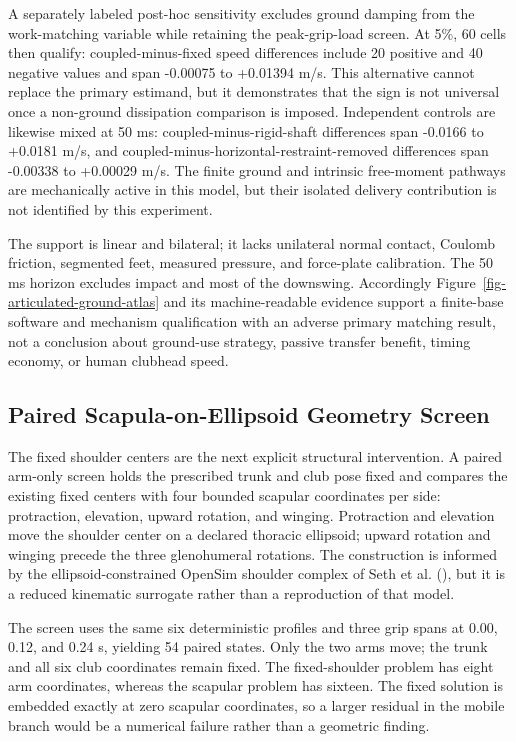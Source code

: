 \documentclass[
  letterpaper,
]{report}
\begin{document}
A separately labeled post-hoc sensitivity excludes ground damping from
the work-matching variable while retaining the peak-grip-load screen. At
5\%, 60 cells then qualify: coupled-minus-fixed speed differences
include 20 positive and 40 negative values and span -0.00075 to +0.01394
m/s. This alternative cannot replace the primary estimand, but it
demonstrates that the sign is not universal once a non-ground
dissipation comparison is imposed. Independent controls are likewise
mixed at 50 ms: coupled-minus-rigid-shaft differences span -0.0166 to
+0.0181 m/s, and coupled-minus-horizontal-restraint-removed differences
span -0.00338 to +0.00029 m/s. The finite ground and intrinsic
free-moment pathways are mechanically active in this model, but their
isolated delivery contribution is not identified by this experiment.

The support is linear and bilateral; it lacks unilateral normal contact,
Coulomb friction, segmented feet, measured pressure, and force-plate
calibration. The 50 ms horizon excludes impact and most of the
downswing. Accordingly Figure~\ref{fig-articulated-ground-atlas} and its
machine-readable evidence support a finite-base software and mechanism
qualification with an adverse primary matching result, not a conclusion
about ground-use strategy, passive transfer benefit, timing economy, or
human clubhead speed.

\subsection{Paired Scapula-on-Ellipsoid Geometry
Screen}\label{paired-scapula-on-ellipsoid-geometry-screen}

The fixed shoulder centers are the next explicit structural
intervention. A paired arm-only screen holds the prescribed trunk and
club pose fixed and compares the existing fixed centers with four
bounded scapular coordinates per side: protraction, elevation, upward
rotation, and winging. Protraction and elevation move the shoulder
center on a declared thoracic ellipsoid; upward rotation and winging
precede the three glenohumeral rotations. The construction is informed
by the ellipsoid-constrained OpenSim shoulder complex of Seth et al.
(), but it is a reduced kinematic surrogate
rather than a reproduction of that model.

The screen uses the same six deterministic profiles and three grip spans
at 0.00, 0.12, and 0.24 s, yielding 54 paired states. Only the two arms
move; the trunk and all six club coordinates remain fixed. The
fixed-shoulder problem has eight arm coordinates, whereas the scapular
problem has sixteen. The fixed solution is embedded exactly at zero
scapular coordinates, so a larger residual in the mobile branch would be
a numerical failure rather than a geometric finding.
\end{document}
